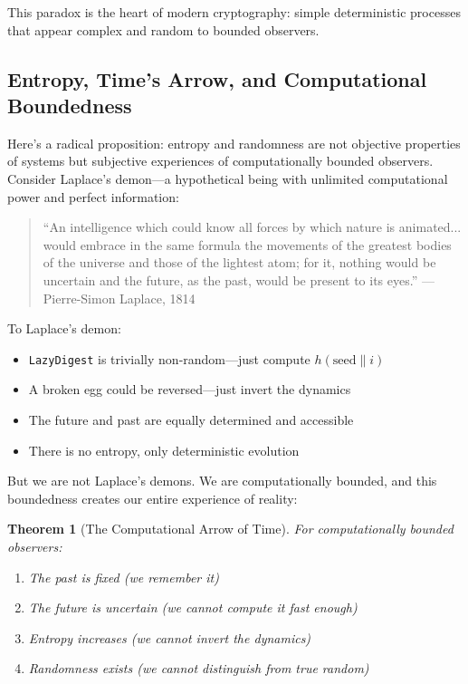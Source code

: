 \documentclass[11pt]{article}
\newtheorem{theorem}{Theorem}
\begin{document}
This paradox is the heart of modern cryptography: simple deterministic processes that appear complex and random to bounded observers.

\subsection{Entropy, Time's Arrow, and Computational Boundedness}

Here's a radical proposition: entropy and randomness are not objective properties of systems but subjective experiences of computationally bounded observers. Consider Laplace's demon---a hypothetical being with unlimited computational power and perfect information:

\begin{quote}
``An intelligence which could know all forces by which nature is animated... would embrace in the same formula the movements of the greatest bodies of the universe and those of the lightest atom; for it, nothing would be uncertain and the future, as the past, would be present to its eyes.'' ---Pierre-Simon Laplace, 1814
\end{quote}

To Laplace's demon:
\begin{itemize}
\item \texttt{LazyDigest} is trivially non-random---just compute $h(\text{seed} \| i)$
\item A broken egg could be reversed---just invert the dynamics
\item The future and past are equally determined and accessible
\item There is no entropy, only deterministic evolution
\end{itemize}

But we are not Laplace's demons. We are computationally bounded, and this boundedness creates our entire experience of reality:

\begin{theorem}[The Computational Arrow of Time]
For computationally bounded observers:
\begin{enumerate}
\item The past is fixed (we remember it)
\item The future is uncertain (we cannot compute it fast enough)
\item Entropy increases (we cannot invert the dynamics)
\item Randomness exists (we cannot distinguish from true random)
\end{enumerate}
\end{theorem}
\end{document}

